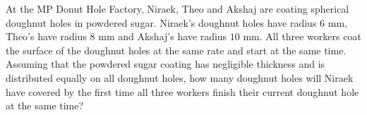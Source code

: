 At the MP Donut Hole Factory, Niraek, Theo and Akshaj are coating spherical doughnut holes in powdered sugar. Niraek's doughnut holes have radius $6$ mm, Theo's have radius $8$ mm and Akshaj's have radius $10$ mm. All three workers coat the surface of the doughnut holes at the same rate and start at the same time. Assuming that the powdered sugar coating has negligible thickness and is distributed equally on all doughnut holes, how many doughnut holes will Niraek have covered by the first time all three workers finish their current doughnut hole at the same time?
